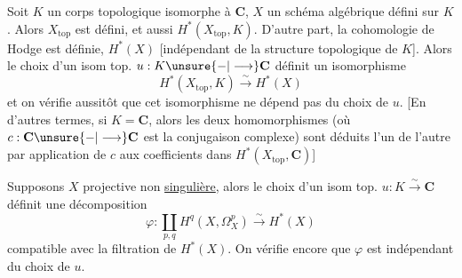 
Soit $K$ un corps topologique isomorphe à $\mathbf C$, $X$ un schéma algébrique défini sur $K$. Alors $X_{\mathrm{top}}$ est défini, et aussi $H^*(X_{\mathrm{top}},K)$. D'autre part,  la cohomologie de Hodge est définie,  $H^*(X)$ [indépendant de la structure topologique de $K$]. Alors le choix d'un isom top. $u:K\unsure{-|\longrightarrow}\mathbf C$ définit un isomorphisme
\[
H^*(X_{\mathrm{top}},K)\xrightarrow{\sim}H^*(X)
\]
et on vérifie aussitôt que cet isomorphisme ne dépend pas du choix de $u$. [En d'autres termes, si $K=\mathbf C$, alors les deux homomorphismes
(où $c:\mathbf C\unsure{-|\longrightarrow}\mathbf C$ est la conjugaison complexe) sont  déduits l'un de l'autre par application de $c$ aux coefficients dans $H^*(X_{\mathrm{top}},\mathbf C)$]



Supposons $X$ projective non \uline{singulière}, alors le choix d'un isom top. $u:K\xrightarrow{\sim}\mathbf C$ définit une décomposition
\[
\varphi:\coprod_{p,q}H^q(X,\Omega_X^p)\xrightarrow{\sim}H^*(X)
\]
compatible avec la filtration de $H^*(X)$. On vérifie encore que $\varphi$ est indépendant du choix de $u$.
